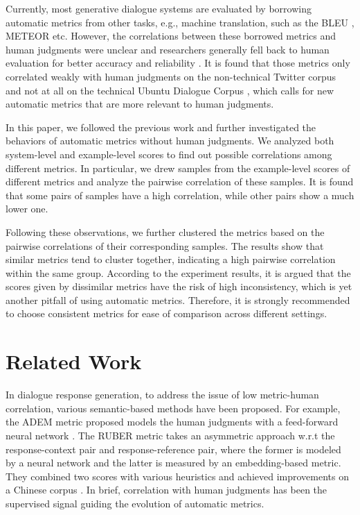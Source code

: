 \documentclass[runningheads]{llncs}
\begin{document}
    Currently, most generative dialogue systems are evaluated by borrowing automatic metrics from other tasks, e.g., machine translation, such as the BLEU \cite{BLEU}, METEOR \cite{METEOR} etc. However, the correlations between these borrowed metrics and human judgments were unclear and researchers generally fell back to human evaluation for better accuracy and reliability \cite{VHRED,Shang}. It is found that those metrics only correlated weakly with human judgments on the non-technical Twitter corpus and not at all on the technical Ubuntu Dialogue Corpus \cite{HowNot}, which calls for new automatic metrics that are more relevant to human judgments.

    In this paper, we followed the previous work and further investigated the behaviors of automatic metrics without human judgments. We analyzed both system-level and example-level scores to find out possible correlations among different metrics. In particular, we drew samples from the example-level scores of different metrics and analyze the pairwise correlation of these samples. It is found that some pairs of samples have a high correlation, while other pairs show a much lower one.

    Following these observations, we further clustered the metrics based on the pairwise correlations of their corresponding samples. The results show that similar metrics tend to cluster together, indicating a high pairwise correlation within the same group. According to the experiment results, it is argued that the scores given by dissimilar metrics have the risk of high inconsistency, which is yet another pitfall of using automatic metrics. Therefore, it is strongly recommended to choose consistent metrics for ease of comparison across different settings.

    \section{Related Work}
    In dialogue response generation, to address the issue of low metric-human correlation, various semantic-based methods have been proposed. For example, the ADEM metric proposed models the human judgments with a feed-forward neural network \cite{ADEM}. The RUBER metric takes an asymmetric approach w.r.t the response-context pair and response-reference pair, where the former is modeled by a neural network and the latter is measured by an embedding-based metric. They combined two scores with various heuristics and achieved improvements on a Chinese corpus \cite{RUBER}. In brief, correlation with human judgments has been the supervised signal guiding the evolution of automatic metrics.
\end{document}
